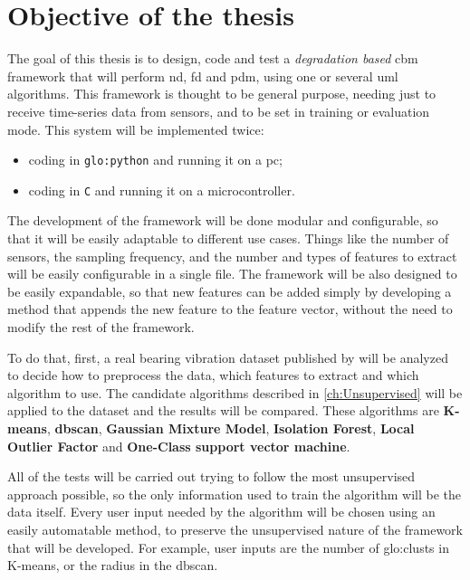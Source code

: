 \section{Objective of the thesis}
\label{sec:objectives}

The goal of this thesis is to design, code and test a \emph{degradation based} \gls{cbm} framework that will perform \gls{nd}, \gls{fd} and \gls{pdm}, using one or several \gls{uml} algorithms. This framework is thought to be general purpose, needing just to receive time-series data from sensors, and to be set in training or evaluation mode.
This system will be implemented twice:
\begin{itemize}
    \item  coding in \texttt{\gls{glo:python}} and running it on a \gls{pc};
    \item   coding in \texttt{C} and running it on a microcontroller.
\end{itemize}

The development of the framework will be done modular and configurable, so that it will be easily adaptable to different use cases. Things like the number of sensors, the sampling frequency, and the number and types of features to extract will be easily configurable in a single file. The framework will be also designed to be easily expandable, so that new features can be added simply by developing a method that appends the new feature to the feature vector, without the need to modify the rest of the framework.

To do that, first, a real bearing vibration dataset published by \cite{IMSpaper} will be analyzed to decide how to preprocess the data, which features to extract and which algorithm to use. 
The candidate algorithms described in \autoref{ch:Unsupervised} will be applied to the dataset and the results will be compared. These algorithms are \textbf{K-means}, \textbf{\gls{dbscan}}, \textbf{Gaussian Mixture Model}, \textbf{Isolation Forest}, \textbf{Local Outlier Factor} and \textbf{One-Class support vector machine}. 

All of the tests will be carried out trying to follow the most unsupervised approach possible, so the only information used to train the algorithm will be the data itself. Every user input needed by the algorithm will be chosen using an easily automatable method, to preserve the unsupervised nature of the framework that will be developed. For example, user inputs are the number of \gls{glo:clust}s in K-means, or the radius in the \gls{dbscan}.



